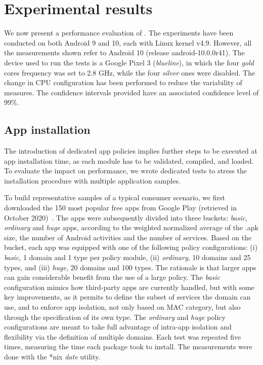 \section{Experimental results}
\label{sect:seapp_performance}

We now present a performance evaluation of \seapp.  The experiments have
been conducted on both Android 9 and 10, each with Linux kernel v4.9.
However, all the measurements shown refer to Android 10 (release
android-10.0.0\textunderscore r41).  The device used to run the tests
is a Google Pixel 3 (\emph{blueline}), in which the four \emph{gold}
cores frequency was set to 2.8 GHz, while the four \emph{silver} ones
were disabled.  The change in CPU configuration has been performed to
reduce the variability of measures.  The confidence intervals provided
have an associated confidence level of 99\%.

\subsection{App installation}

The introduction of dedicated app policies implies further steps to be
executed at app installation time, as each \seapp module has to be
validated, compiled, and loaded.  To evaluate the impact on
performance, we wrote dedicated tests to stress the installation
procedure with multiple application samples.

To build representative samples of a typical consumer scenario, we
first downloaded the 150 most popular free apps from Google Play
(retrieved in October 2020)~\cite{seapp_topapps}.  The apps were
subsequently divided into three buckets: \emph{basic}, \emph{ordinary}
and \emph{huge} apps, according to the weighted normalized average of
the .apk size, the number of Android activities and the number of
services.  Based on the bucket, each app was equipped with one of the
following policy configurations: (i) \emph{basic}, 1 domain and 1 type
per policy module, (ii) \emph{ordinary}, 10 domains and 25 types, and
(iii) \emph{huge}, 20 domains and 100 types.  The rationale is that
larger apps can gain considerable benefit from the use of a large
policy.  The \emph{basic} configuration mimics how third-party apps
are currently handled, but with some key improvements, as it permits
to define the subset of services the domain can use, and to
enforce app isolation, not only based on MAC category, but also
through the specification of its own type.  The \emph{ordinary} and
\emph{huge} policy configurations are meant to take full advantage of
intra-app isolation and flexibility via the definition of multiple
domains.
Each test was repeated five times, measuring the time each package
took to install.  The measurements were done with the *nix {\em date}
utility.

